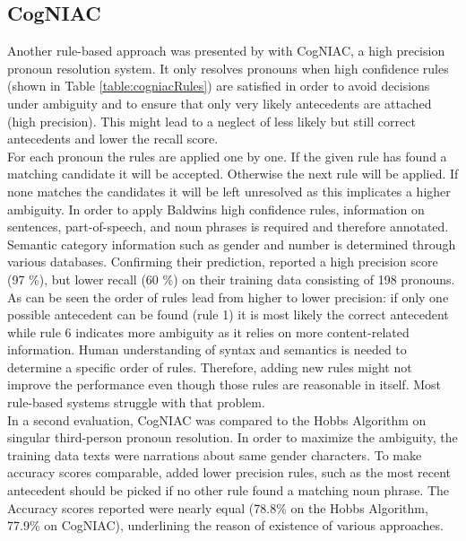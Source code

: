 \subsection{CogNIAC}
Another rule-based approach was presented by \citep{baldwin1997cogniac} with CogNIAC, a high precision pronoun resolution system. It only resolves pronouns when high confidence rules (shown in Table \ref{table:cogniacRules}) are satisfied in order to avoid decisions under ambiguity and to ensure that only very likely antecedents are attached (high precision). This might lead to a neglect of less likely but still correct antecedents and lower the recall score. 
\\
For each pronoun the rules are applied one by one. If the given rule has found a matching candidate it will be accepted. Otherwise the next rule will be applied. If none matches the candidates it will be left unresolved as this implicates a higher ambiguity. In order to apply Baldwins high confidence rules, information on sentences, part-of-speech, and noun phrases is required and therefore annotated. Semantic category information such as gender and number is determined through various databases. Confirming their prediction, \citep{baldwin1997cogniac} reported a high precision score (97 \%), but lower recall (60 \%) on their training data consisting of 198 pronouns.\\
As can be seen the order of rules lead from higher to lower precision: if only one possible antecedent can be found (rule 1) it is most likely the correct antecedent while rule 6 indicates more ambiguity as it relies on more content-related information. Human understanding of syntax and semantics is needed to determine a specific order of rules. Therefore, adding new rules might not improve the performance even though those rules are reasonable in itself. Most rule-based systems struggle with that problem.\\
In a second evaluation, CogNIAC was compared to the Hobbs Algorithm \citep{baldwin1997cogniac,hobbs1978resolving} on singular third-person pronoun resolution. In order to maximize the ambiguity, the training data texts were narrations about same gender characters. To make accuracy scores comparable, \cite{baldwin1997cogniac} added lower precision rules, such as the most recent antecedent should be picked if no other rule found a matching noun phrase. The Accuracy scores reported were nearly equal (78.8\% on the Hobbs Algorithm, 77.9\% on CogNIAC), underlining the reason of existence of various approaches.
